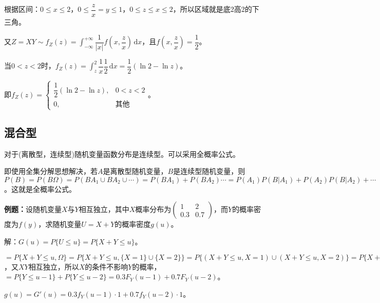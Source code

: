 \documentclass[UTF8, 12pt]{ctexart}
\begin{document}
根据区间：$0\leqslant x\leqslant2$，$0\leqslant\dfrac{z}{x}=y\leqslant1$，$0\leqslant z\leqslant x\leqslant2$，所以区域就是底2高2的下三角。

又$Z=XY\sim f_Z(z)=\displaystyle{\int_{-\infty}^{+\infty}\dfrac{1}{\vert x\vert}f\left(x,\dfrac{z}{x}\right)\,\textrm{d}x}$，且$f\left(x,\dfrac{z}{x}\right)=\dfrac{1}{2}$。

当$0<z<2$时，$f_Z(z)=\displaystyle{\int_z^2}\dfrac{1}{x}\dfrac{1}{2}\,\textrm{d}x=\dfrac{1}{2}(\ln2-\ln z)$。

即$f_Z(z)=\left\{\begin{array}{ll}
    \dfrac{1}{2}(\ln2-\ln z), & 0<z<2 \\
    0, & \text{其他}
\end{array}\right.$。

\subsection{混合型}
 
对于(离散型，连续型)随机变量函数分布是连续型。可以采用全概率公式。

即使用全集分解思想解决，若$A$是离散型随机变量，$B$是连续型随机变量，则$P(B)=P(B\Omega)=P(BA_1\cup BA_2\cup\cdots)=P(BA_1)+P(BA_2)\cdots=P(A_1)P(B|A_1)+P(A_2)P(B|A_2)+\cdots$。这就是全概率公式。

\textbf{例题：}设随机变量$X$与$Y$相互独立，其中$X$概率分布为$\left(\begin{array}{cc}
    1 & 2 \\
    0.3 & 0.7
\end{array}\right)$，而$Y$的概率密度为$f(y)$，求随机变量$U=X+Y$的概率密度$g(u)$。

解：$G(u)=P\{U\leqslant u\}=P\{X+Y\leqslant u\}$。

$=P\{X+Y\leqslant u,\Omega\}=P\{X+Y\leqslant u,\{X=1\}\cup\{X=2\}\}=P\{(X+Y\leqslant u,X=1)\cup(X+Y\leqslant u,X=2)\}=P\{X+Y\leqslant u,X=1\}+P\{X+Y\leqslant u,X=2\}=P(X=1)P\{X+Y\leqslant u|X=1\}+P(X=2)P\{X+Y\leqslant u|X=2\}=0.3P\{Y\leqslant u-1|X=1\}+0.7P\{Y\leqslant u-2|X=2\}$，又$XY$相互独立，所以$X$的条件不影响$Y$的概率，$=P\{Y\leqslant u-1\}+P\{Y\leqslant u-2\}=0.3F_Y(u-1)+0.7F_Y(u-2)$。

$g(u)=G'(u)=0.3f_Y(u-1)\cdot1+0.7f_Y(u-2)\cdot1$。
\end{document}
